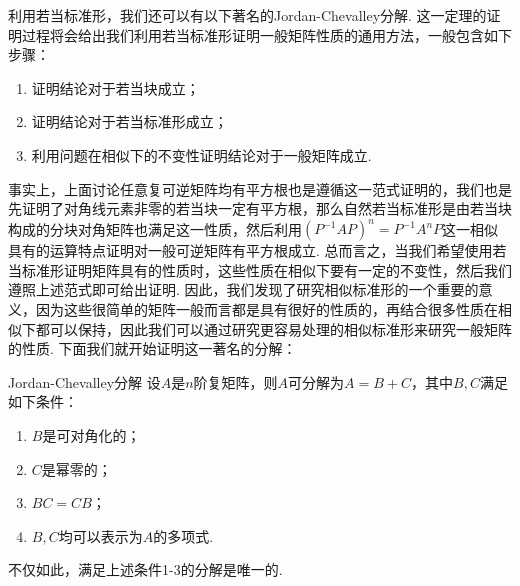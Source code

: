 利用若当标准形，我们还可以有以下著名的Jordan-Chevalley分解. 这一定理的证明过程将会给出我们利用若当标准形证明一般矩阵性质的通用方法，一般包含如下步骤：
\begin{enumerate}
    \item 证明结论对于若当块成立；
    \item 证明结论对于若当标准形成立；
    \item 利用问题在相似下的不变性证明结论对于一般矩阵成立.
\end{enumerate}

事实上，上面讨论任意复可逆矩阵均有平方根也是遵循这一范式证明的，我们也是先证明了对角线元素非零的若当块一定有平方根，那么自然若当标准形是由若当块构成的分块对角矩阵也满足这一性质，然后利用$(P^{-1}AP)^n=P^{-1}A^nP$这一相似具有的运算特点证明对一般可逆矩阵有平方根成立. 总而言之，当我们希望使用若当标准形证明矩阵具有的性质时，这些性质在相似下要有一定的不变性，然后我们遵照上述范式即可给出证明. 因此，我们发现了研究相似标准形的一个重要的意义，因为这些很简单的矩阵一般而言都是具有很好的性质的，再结合很多性质在相似下都可以保持，因此我们可以通过研究更容易处理的相似标准形来研究一般矩阵的性质. 下面我们就开始证明这一著名的分解：

\begin{theorem}{Jordan-Chevalley分解}{}
    设$A$是$n$阶复矩阵，则$A$可分解为$A=B+C$，其中$B,C$满足如下条件：
    \begin{enumerate}
        \item $B$是可对角化的；
        \item $C$是幂零的；
        \item $BC=CB$；
        \item $B,C$均可以表示为$A$的多项式.
    \end{enumerate}
    不仅如此，满足上述条件1-3的分解是唯一的.
\end{theorem}

